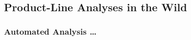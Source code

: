 \begin{frame}{\myframetitle}
\end{frame}


\subsection{Product-Line Analyses in the Wild}

\subsubsection*{Automated Analysis \ldots}

